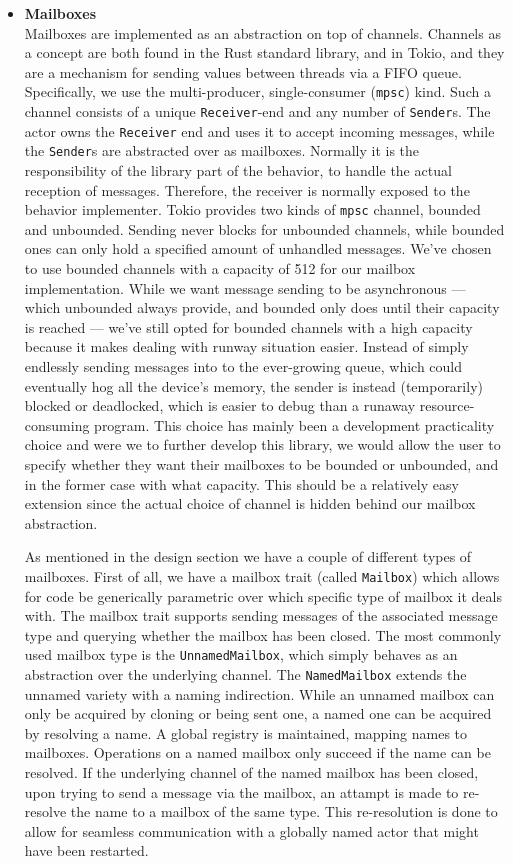 \documentclass[a4paper]{article}
\begin{document}
\begin{itemize}
\item{\bf Mailboxes} \\
Mailboxes are implemented as an abstraction on top of channels. Channels as a
concept are both found in the Rust standard library, and in Tokio, and they are a
mechanism for sending values between threads via a FIFO queue. Specifically, we
use the multi-producer, single-consumer (\texttt{mpsc}) kind. Such a channel
consists of a unique \texttt{Receiver}-end and any number of \texttt{Sender}s.
The actor owns the \texttt{Receiver} end and uses it to accept incoming
messages, while the \texttt{Sender}s are abstracted over as mailboxes. Normally
it is the responsibility of the library part of the behavior, to handle the
actual reception of messages. Therefore, the receiver is normally exposed to the
behavior implementer.
Tokio
provides two kinds of \texttt{mpsc} channel, bounded and unbounded. Sending
never blocks for unbounded channels, while bounded ones can only hold a
specified amount of unhandled messages. We've chosen to use bounded channels
with a capacity of 512 for our mailbox implementation. While we want message
sending to be asynchronous --- which unbounded always provide, and bounded only
does until their capacity is reached --- we've still opted for bounded channels
with a high capacity because it makes dealing with runway situation easier.
Instead of simply endlessly sending messages into to the ever-growing queue,
which could eventually hog all the device's memory, the sender is instead
(temporarily) blocked or deadlocked, which is easier to debug than a runaway
resource-consuming program.
This choice has mainly been a development practicality choice and were we to
further develop this library, we would allow the user to specify whether they
want their mailboxes to be bounded or unbounded, and in the former case with
what capacity. This should be a relatively easy extension since the actual
choice of channel is hidden behind our mailbox abstraction.

As mentioned in the design section we have a couple of different types of
mailboxes. First of all, we have a mailbox trait (called \texttt{Mailbox}) which
allows for code be generically parametric over which specific type of mailbox it
deals with. The mailbox trait supports sending messages of the associated
message type and querying whether the mailbox has been closed. The most commonly
used mailbox type is the \texttt{UnnamedMailbox}, which simply behaves as an
abstraction over the underlying channel. The \texttt{NamedMailbox} extends the
unnamed variety with a naming indirection. While an unnamed mailbox can only be
acquired by cloning or being sent one, a named one can be acquired by resolving
a name. A global registry is maintained, mapping names to mailboxes. Operations
on a named mailbox only succeed if the name can be
resolved. If the underlying channel of the named mailbox has been closed, upon
trying to send a message via the mailbox, an attampt is made to re-resolve the name to a
mailbox of the same type. This re-resolution is done to allow for seamless
communication with a globally named actor that might have been restarted.


\end{itemize}
\end{document}
